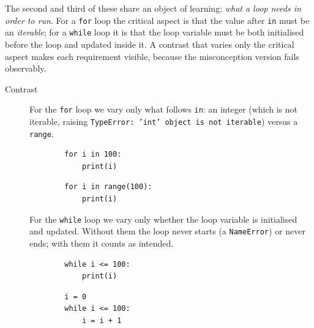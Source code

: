 The second and third of these share an object of learning: \emph{what a loop
needs in order to run}. For a \texttt{for} loop the critical aspect
is that the value after \texttt{in} must be an \emph{iterable}; for a
\texttt{while} loop it is that the loop variable must be both
initialised before the loop and updated inside it. A contrast that varies only
the critical aspect makes each requirement visible, because the misconception
version fails observably.

\begin{description}
  \item[Contrast] For the \texttt{for} loop we vary only what follows
    \texttt{in}: an integer (which is not iterable, raising
    \texttt{TypeError: 'int' object is not iterable}) versus a
    \texttt{range}.

    \hfill
    \begin{minipage}[t]{0.45\columnwidth}
      \begin{verbatim}
        for i in 100:
            print(i)
      \end{verbatim}
    \end{minipage}
    \hfill
    \begin{minipage}[t]{0.45\columnwidth}
      \begin{verbatim}
        for i in range(100):
            print(i)
      \end{verbatim}
    \end{minipage}
    \newline
    For the \texttt{while} loop we vary only whether the loop
    variable is initialised and updated. Without them the loop never starts
    (a \texttt{NameError}) or never ends; with them it counts as
    intended.

    \hfill
    \begin{minipage}[t]{0.45\columnwidth}
      \begin{verbatim}
        while i <= 100:
            print(i)
      \end{verbatim}
    \end{minipage}
    \hfill
    \begin{minipage}[t]{0.45\columnwidth}
      \begin{verbatim}
        i = 0
        while i <= 100:
            i = i + 1
      \end{verbatim}
    \end{minipage}
\end{description}

